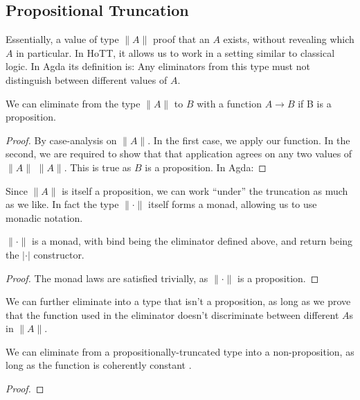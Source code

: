 \begin{subappendices}
\subsection{Propositional Truncation} \label{prop-trunc}
Essentially, a value of type \(\lVert A \rVert\) proof that an \(A\) exists,
without revealing which \(A\) in particular.
In HoTT, it allows us to work in a setting similar to classical logic.
In Agda its definition is:
Any eliminators from this type must not distinguish between different values of
\(A\).

\begin{lemma}
  We can eliminate from the type \(\lVert A \rVert\) to \(B\) with a function
  \(A \rightarrow B\) if B is a proposition.
\end{lemma}
\begin{proof}
  By case-analysis on \(\lVert A \rVert\).
  In the first case, we apply our function.
  In the second, we are required to show that that application agrees on any two
  values of \(\lVert A \rVert\) \(\lVert A \rVert\).
  This is true as \(B\) is a proposition.
  In Agda:
\end{proof}

Since \(\lVert A \rVert\) is itself a proposition, we can work ``under'' the
truncation as much as we like.
In fact the type \(\lVert \cdot \rVert\) itself forms a monad, allowing us to
use monadic notation.
\begin{lemma}
  \(\lVert \cdot \rVert\) is a monad, with bind being the eliminator defined
  above, and return being the \(\lvert \cdot \rvert\) constructor.
\end{lemma}
\begin{proof}
  The monad laws are satisfied trivially, as \(\lVert \cdot \rVert\) is a
  proposition.
\end{proof}

We can further eliminate into a type that isn't a proposition, as long as we
prove that the function used in the eliminator doesn't discriminate between
different \(A\)s in \(\lVert A \rVert\).
\begin{lemma} \label{elim-non-prop}
  We can eliminate from a propositionally-truncated type into a non-proposition,
  as long as the function is coherently constant
  \cite{krausGeneralUniversalProperty2015}.
\end{lemma}
\begin{proof}
\end{proof}


\end{subappendices}
